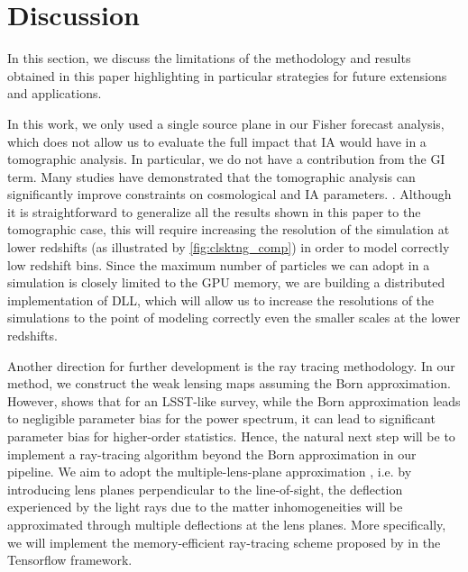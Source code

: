 \documentclass[twocolumn,twocolappendix]{aastex63}
\begin{document}
\section{Discussion}\label{Discussion}
In this section, we discuss the limitations of the methodology and results obtained in this paper highlighting in particular strategies for future extensions and  applications. 
 

In this work, we only used a single source plane in our Fisher forecast analysis, which does not allow us to evaluate the full impact that IA would have in a tomographic analysis. In particular, we do not have a contribution from the GI term. Many studies have demonstrated that the tomographic analysis can significantly improve constraints on cosmological and IA parameters.  \citep{king2003separating, heymans2004weak, troxel2015intrinsic}. Although it is straightforward to generalize all the results shown in this paper to the tomographic case, this will require increasing the resolution of the simulation at lower redshifts (as illustrated by \autoref{fig:clsktng_comp}) in order to model correctly low redshift bins. Since the maximum number of particles we can adopt in a simulation is closely limited to the GPU memory, we are building a distributed implementation of DLL, which will allow us to increase the resolutions of the simulations to the point of modeling correctly even the smaller scales at the lower redshifts.


Another direction for further development is the ray tracing methodology. In our method, we construct the weak lensing maps assuming the Born approximation. However, \cite{petri2017validity} shows that for an LSST-like survey, while the Born approximation leads to negligible parameter bias for the power spectrum, it can lead to significant parameter bias for higher-order statistics. 
Hence, the natural next step will be to implement a ray-tracing algorithm beyond the Born approximation in our pipeline.
 We aim to adopt the multiple-lens-plane approximation \citep{1986ApJ...310..568B, Stella_Seitz_1994, jain2000ray, Vale_2003, refId0}, i.e. by introducing lens planes perpendicular to the line-of-sight, the deflection experienced by the light rays due to the matter inhomogeneities will be approximated through multiple deflections at the lens planes. 
More specifically, we will implement the memory-efficient ray-tracing scheme proposed by \cite{refId0} in the Tensorflow framework.
\end{document}

